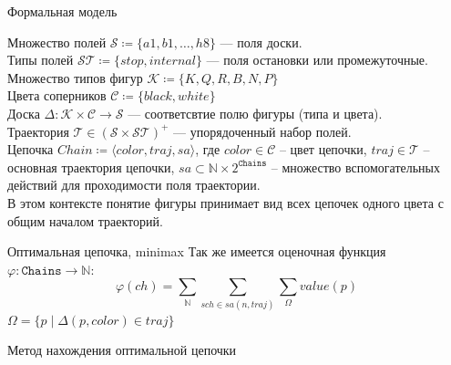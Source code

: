 \begin{frame}{Формальная модель}

Множество полей $\mathcal{S} \coloneqq \{a1, b1, \dots, h8\}$ --- поля доски.\\
Типы полей $\mathcal{ST} \coloneqq \{stop, internal\}$ --- поля остановки или промежуточные.\\
Множество типов фигур $\mathcal{K} \coloneqq \{ K, Q, R, B, N, P \}$ \\
Цвета соперников $\mathcal{C} \coloneqq \{black, white\}$ \\
Доска $\Delta  \colon \mathcal{K} \times \mathcal{C} \to \mathcal{S} $ --- соответсвтие полю фигуры (типа и цвета). \\
Траектория $\mathcal{T} \in \left( \mathcal{S} \times \mathcal{ST} \right)^+$ --- упорядоченный набор полей.\\
Цепочка $Chain \coloneqq \langle color, traj, sa \rangle$,  где $color \in \mathcal{C}$ --  цвет цепочки, $traj \in \mathcal{T}$ -- основная траектория цепочки, $sa \subset \mathbb{N} \times 2^{\mathtt{Chains}}$ -- множество вспомогательных действий для проходимости поля траектории. \\
В этом контексте понятие фигуры принимает вид всех цепочек одного цвета с общим началом траекторий.
\end{frame}

\begin{frame}{Оптимальная цепочка, minimax} %
Так же имеется оценочная функция $\varphi \colon \mathtt{Chains} \to \mathbb{N}$:
$$
 \varphi \left( ch \right) = \sum_{\mathbb{N}} \sum_{sch \in sa\left(n, traj\right)} \sum_{\Omega}  value(p)
$$
$\Omega = \{p \mid \Delta \left( p, color \right) \in traj\}$


\end{frame}

\begin{frame}{Метод нахождения оптимальной цепочки} %

\end{frame}

